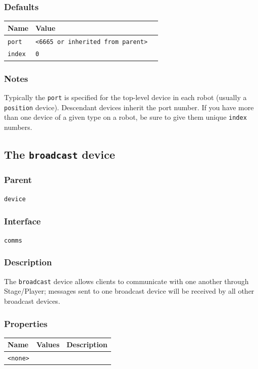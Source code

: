 \documentclass[11pt,twoside]{report}
\begin{document}
\subsubsection*{Defaults}
\begin{tabularx}{\columnwidth}{llX}
\hline
Name & Value\\
\hline
\verb'port' & \verb'<6665 or inherited from parent>'\\
\verb'index' & \verb'0'\\
\hline
\end{tabularx}

\subsubsection{Notes}
Typically the \verb'port' is specified for the top-level
device in each robot (usually a \verb'position' device). Descendant
devices inherit the port number. If you have more than one device of a
given type on a robot, be sure to give them unique \verb'index'
numbers.

\newpage
\subsection{The {\tt broadcast} device}

\subsubsection*{Parent}
{\tt device}

\subsubsection*{Interface}
{\tt comms}

\subsubsection*{Description}
The {\tt broadcast} device allows clients to communicate with one
another through Stage/Player; messages sent to one broadcast device
will be received by all other broadcast devices. 

\subsubsection*{Properties}
\begin{tabularx}{\columnwidth}{llX}
\hline
Name & Values & Description \\
\hline
\verb'<none>'\\
\hline
\end{tabularx}
\end{document}
